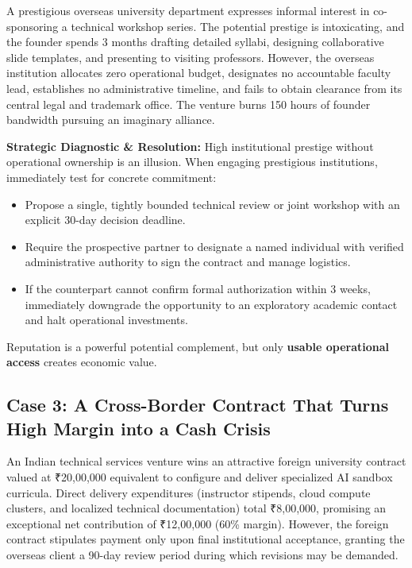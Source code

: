 A prestigious overseas university department expresses informal interest in co-sponsoring a technical workshop series. The potential prestige is intoxicating, and the founder spends 3 months drafting detailed syllabi, designing collaborative slide templates, and presenting to visiting professors. However, the overseas institution allocates zero operational budget, designates no accountable faculty lead, establishes no administrative timeline, and fails to obtain clearance from its central legal and trademark office. The venture burns 150 hours of founder bandwidth pursuing an imaginary alliance.

\textbf{Strategic Diagnostic \& Resolution:} High institutional prestige without operational ownership is an illusion. When engaging prestigious institutions, immediately test for concrete commitment:
\begin{itemize}
\item Propose a single, tightly bounded technical review or joint workshop with an explicit 30-day decision deadline.
\item Require the prospective partner to designate a named individual with verified administrative authority to sign the contract and manage logistics.
\item If the counterpart cannot confirm formal authorization within 3 weeks, immediately downgrade the opportunity to an exploratory academic contact and halt operational investments.
\end{itemize}
Reputation is a powerful potential complement, but only \textbf{usable operational access} creates economic value.

\subsection{Case 3: A Cross-Border Contract That Turns High Margin into a Cash Crisis}
\label{sec:case3_cross_border_cash_crisis}

An Indian technical services venture wins an attractive foreign university contract valued at ₹20,00,000 equivalent to configure and deliver specialized AI sandbox curricula. Direct delivery expenditures (instructor stipends, cloud compute clusters, and localized technical documentation) total ₹8,00,000, promising an exceptional net contribution of ₹12,00,000 (60\% margin). However, the foreign contract stipulates payment only upon final institutional acceptance, granting the overseas client a 90-day review period during which revisions may be demanded.

